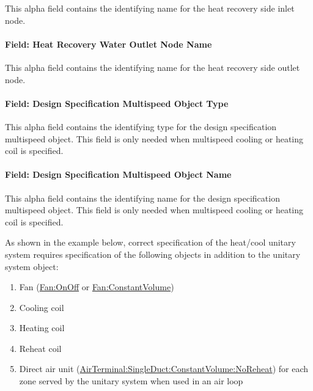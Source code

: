 This alpha field contains the identifying name for the heat recovery side inlet node.

\paragraph{Field: Heat Recovery Water Outlet Node Name}\label{field-heat-recovery-water-outlet-node-name-000}

This alpha field contains the identifying name for the heat recovery side outlet node.

\paragraph{Field: Design Specification Multispeed Object Type}\label{field-design-specification-multispeed-object-type}

This alpha field contains the identifying type for the design specification multispeed object. This field is only needed when multispeed cooling or heating coil is specified.

\paragraph{Field: Design Specification Multispeed Object Name}\label{field-design-specification-multispeed-object-name}

This alpha field contains the identifying name for the design specification multispeed object. This field is only needed when multispeed cooling or heating coil is specified.

As shown in the example below, correct specification of the heat/cool unitary system requires specification of the following objects in addition to the unitary system object:

\begin{enumerate}
\def\labelenumi{\arabic{enumi})}
\item
  Fan (\hyperref[fanonoff]{Fan:OnOff} or \hyperref[fanconstantvolume]{Fan:ConstantVolume})
\item
  Cooling coil
\item
  Heating coil
\item
  Reheat coil
\item
  Direct air unit (\hyperref[airterminalsingleductconstantvolumenoreheat]{AirTerminal:SingleDuct:ConstantVolume:NoReheat}) for each zone served by the unitary system when used in an air loop
\end{enumerate}

